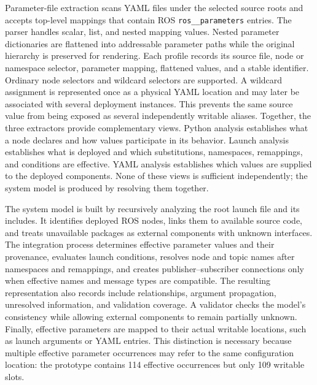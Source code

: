 Parameter-file extraction scans YAML files under the selected source roots and accepts top-level mappings that contain ROS \texttt{ros\_\_parameters} entries. The parser handles scalar, list, and nested mapping values. Nested parameter dictionaries are flattened into addressable parameter paths while the original hierarchy is preserved for rendering.
Each profile records its source file, node or namespace selector, parameter mapping, flattened values, and a stable identifier. Ordinary node selectors and wildcard selectors are supported. A wildcard assignment is represented once as a physical YAML location and may later be associated with several deployment instances. This prevents the same source value from being exposed as several independently writable aliases.
Together, the three extractors provide complementary views. Python analysis establishes what a node declares and how values participate in its behavior. Launch analysis establishes what is deployed and which substitutions, namespaces, remappings, and conditions are effective. YAML analysis establishes which values are supplied to the deployed components. None of these views is sufficient independently; the system model is produced by resolving them together.

The system model is built by recursively analyzing the root launch file and its includes. It identifies deployed ROS nodes, links them to available source code, and treats unavailable packages as external components with unknown interfaces. The integration process determines effective parameter values and their provenance, evaluates launch conditions, resolves node and topic names after namespaces and remappings, and creates publisher--subscriber connections only when effective names and message types are compatible. The resulting representation also records include relationships, argument propagation, unresolved information, and validation coverage. A validator checks the model's consistency while allowing external components to remain partially unknown. Finally, effective parameters are mapped to their actual writable locations, such as launch arguments or YAML entries. This distinction is necessary because multiple effective parameter occurrences may refer to the same configuration location: the prototype contains 114 effective occurrences but only 109 writable slots.

